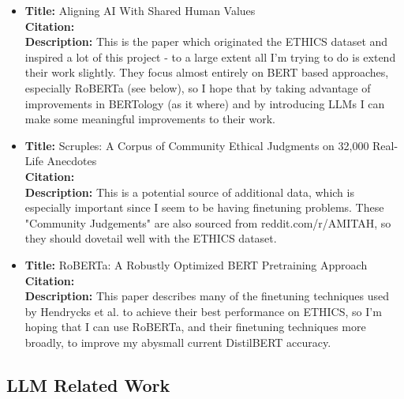 \documentclass[11pt,a4paper]{article}
\begin{document}
\begin{itemize}
    \item\textbf{Title:} Aligning AI With Shared Human Values \\
    \textbf{Citation:} \cite{hendrycks2023aligning} \\
    \textbf{Description:} This is the paper which originated the ETHICS dataset and inspired a lot of this project - to a large extent all I'm trying to do is extend their work slightly. They focus almost entirely on BERT based approaches, especially RoBERTa (see below), so I hope that by taking advantage of improvements in BERTology (as it where) and by introducing LLMs I can make some meaningful improvements to their work.
    
    \item\textbf{Title:} Scruples: A Corpus of Community Ethical Judgments on 32,000 Real-Life Anecdotes \\
    \textbf{Citation:} \cite{lourie2021scruples} \\
    \textbf{Description:} This is a potential source of additional data, which is especially important since I seem to be having finetuning problems. These "Community Judgements" are also sourced from reddit.com/r/AMITAH, so they should dovetail well with the ETHICS dataset.

    \item\textbf{Title:} RoBERTa: A Robustly Optimized BERT Pretraining Approach \\
    \textbf{Citation:} \cite{liu2019roberta} \\
    \textbf{Description:} This paper describes many of the finetuning techniques used by Hendrycks et al. to achieve their best performance on ETHICS, so I'm hoping that I can use RoBERTa, and their finetuning techniques more broadly, to improve my abysmall current DistilBERT accuracy.
\end{itemize}

\subsection{LLM Related Work}
\end{document}
